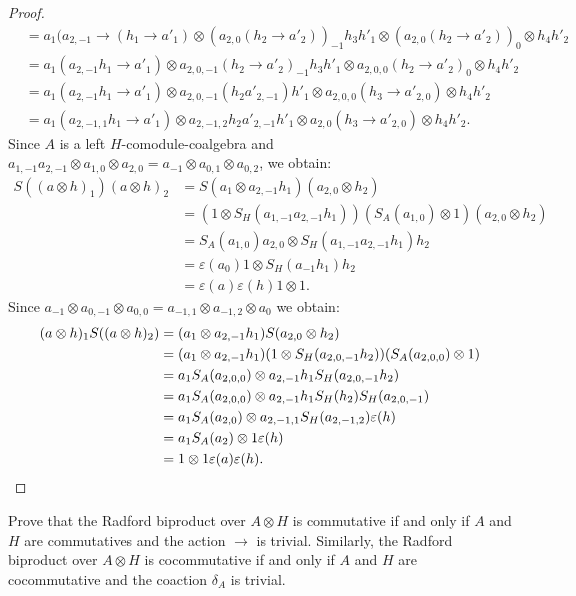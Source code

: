 \begin{proof}
\begin{align*}
 & =a_{1}(a_{2,-1}\to(h_{1}\to a'_{1})\otimes(a_{2,0}(h_{2}\to a'_{2}))_{-1}h_{3}h'_{1}\otimes(a_{2,0}(h_{2}\to a'_{2}))_{0}\otimes h_{4}h'_{2}\\
 & =a_{1}(a_{2,-1}h_{1}\to a'_{1})\otimes a_{2,0,-1}(h_{2}\to a'_{2})_{-1}h_{3}h'_{1}\otimes a_{2,0,0}(h_{2}\to a'_{2})_{0}\otimes h_{4}h'_{2}\\
 & =a_{1}(a_{2,-1}h_{1}\to a'_{1})\otimes a_{2,0,-1}(h_{2}a'_{2,-1})h'_{1}\otimes a_{2,0,0}(h_{3}\to a'_{2,0})\otimes h_{4}h'_{2}\\
 & =a_{1}(a_{2,-1,1}h_{1}\to a'_{1})\otimes a_{2,-1,2}h_{2}a'_{2,-1}h'_{1}\otimes a_{2,0}(h_{3}\to a'_{2,0})\otimes h_{4}h'_{2}.
\end{align*}
Since $A$ is a left $H$-comodule-coalgebra and $a_{1,-1}a_{2,-1}\otimes a_{1,0}\otimes a_{2,0}=a_{-1}\otimes a_{0,1}\otimes a_{0,2}$,
we obtain: 
\begin{align*}
S((a\otimes h)_{1})(a\otimes h)_{2} & =S(a_{1}\otimes a_{2,-1}h_{1})(a_{2,0}\otimes h_{2})\\
 & =(1\otimes S_{H}(a_{1,-1}a_{2,-1}h_{1}))(S_{A}(a_{1,0})\otimes1)(a_{2,0}\otimes h_{2})\\
 & =S_{A}(a_{1,0})a_{2,0}\otimes S_{H}(a_{1,-1}a_{2,-1}h_{1})h_{2}\\
 & =\varepsilon(a_{0})1\otimes S_{H}(a_{-1}h_{1})h_{2}\\
 & =\varepsilon(a)\varepsilon(h)1\otimes1.
\end{align*}
Since $a_{-1}\otimes a_{0,-1}\otimes a_{0,0}=a_{-1,1}\otimes a_{-1,2}\otimes a_{0}$ we obtain:
\begin{align*}
(a\otimes h)_{1}S((a\otimes h)_{2}) & =(a_{1}\otimes a_{2,-1}h_{1})S(a_{2,0}\otimes h_{2})\\
 & =(a_{1}\otimes a_{2,-1}h_{1})(1\otimes S_{H}(a_{2,0,-1}h_{2}))(S_{A}(a_{2,0,0})\otimes1)\\
 & =a_{1}S_{A}(a_{2,0,0})\otimes a_{2,-1}h_{1}S_{H}(a_{2,0,-1}h_{2})\\
 & =a_{1}S_{A}(a_{2,0,0})\otimes a_{2,-1}h_{1}S_{H}(h_{2})S_{H}(a_{2,0,-1})\\
 & =a_{1}S_{A}(a_{2,0})\otimes a_{2,-1,1}S_{H}(a_{2,-1,2})\varepsilon(h)\\
 & =a_{1}S_{A}(a_{2})\otimes1\varepsilon(h)\\
 & =1\otimes1\varepsilon(a)\varepsilon(h).\qedhere
 \end{align*}
\end{proof}

\begin{exercise}
Prove that the Radford biproduct over $A\otimes H$ is commutative if and only
if $A$ and $H$ are commutatives and the action $\to$ is trivial.  Similarly,
the Radford biproduct over $A\otimes H$ is cocommutative if and only if $A$ and
$H$ are cocommutative and the coaction $\delta_{A}$ is trivial.
\end{exercise}

